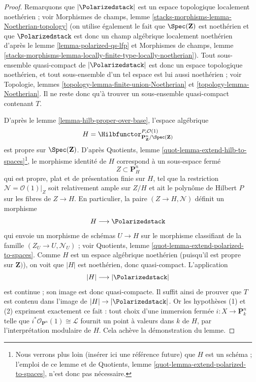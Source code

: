 \begin{proof}
Remarquons que $|\Polarizedstack|$ est un espace topologique localement
noethérien ; voir Morphismes de champs, lemme
\ref{stacks-morphisms-lemma-Noetherian-topology}
(on utilise également le fait que $\Spec(\mathbf{Z})$ est noethérien et
que $\Polarizedstack$ est donc un champ algébrique localement noethérien
d'après le lemme \ref{lemma-polarized-qs-lfp} et Morphismes de champs,
lemme
\ref{stacks-morphisms-lemma-locally-finite-type-locally-noetherian}).
Tout sous-ensemble quasi-compact de $|\Polarizedstack|$ est donc un espace
topologique noethérien, et tout sous-ensemble d'un tel espace est lui aussi
noethérien ; voir Topologie, lemmes
\ref{topology-lemma-finite-union-Noetherian} et
\ref{topology-lemma-Noetherian}.
Il ne reste donc qu'à trouver un sous-ensemble quasi-compact contenant
$T$.

\medskip\noindent
D'après le lemme \ref{lemma-hilb-proper-over-base}, l'espace algébrique
$$
H =
\Hilbfunctor^{P, \mathcal{O}(1)}_{\mathbf{P}^n_\mathbf{Z}/\Spec(\mathbf{Z})}
$$
est propre sur $\Spec(\mathbf{Z})$. D'après Quotients, lemme
\ref{quot-lemma-extend-hilb-to-spaces}\footnote{Nous verrons plus loin
(insérer ici une référence future) que $H$ est un schéma ; l'emploi de ce
lemme et de Quotients, lemme
\ref{quot-lemma-extend-polarized-to-spaces}, n'est donc pas nécessaire.},
le morphisme identité de $H$ correspond à un sous-espace fermé
$$
Z \subset \mathbf{P}^n_H
$$
qui est propre, plat et de présentation finie sur $H$, tel que la
restriction $\mathcal{N} = \mathcal{O}(1)|_Z$ soit relativement ample sur
$Z/H$ et ait le polynôme de Hilbert $P$ sur les fibres de $Z \to H$.
En particulier, la paire $(Z \to H, \mathcal{N})$ définit un morphisme
$$
H \longrightarrow \Polarizedstack
$$
qui envoie un morphisme de schémas $U \to H$ sur le morphisme classifiant
de la famille $(Z_U \to U, \mathcal{N}_U)$ ; voir Quotients, lemme
\ref{quot-lemma-extend-polarized-to-spaces}.
Comme $H$ est un espace algébrique noethérien (puisqu'il est propre sur
$\mathbf{Z})$), on voit que $|H|$ est noethérien, donc quasi-compact.
L'application
$$
|H| \longrightarrow |\Polarizedstack|
$$
est continue ; son image est donc quasi-compacte.
Il suffit ainsi de prouver que $T$ est contenu dans l'image de
$|H| \to |\Polarizedstack|$.
Or les hypothèses (1) et (2) expriment exactement ce fait : tout choix
d'une immersion fermée $i : X \to \mathbf{P}^n_k$ telle que
$i^*\mathcal{O}_{\mathbf{P}^n}(1) \cong \mathcal{L}$ fournit un point à
valeurs dans $k$ de $H$, par l'interprétation modulaire de $H$.
Cela achève la démonstration du lemme.
\end{proof}






